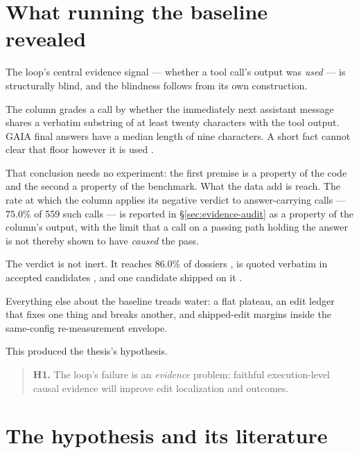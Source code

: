 \section{What running the baseline revealed}
\label{sec:baseline-revealed}

The loop's central evidence signal --- whether a tool call's output was
\emph{used} --- is structurally blind, and the blindness follows from its
own construction.

The column grades a call by whether the immediately next assistant message
shares a verbatim substring of at least twenty characters with the tool
output. GAIA final answers have a median length of nine characters. A short
fact cannot clear that floor however it is used .

That conclusion needs no experiment: the first premise is a property of
the code and the second a property of the benchmark. What the data add
is reach. The rate at which the column applies its negative verdict to
answer-carrying calls --- $75.0\%$ of 559 such calls  --- is
reported in \S\ref{sec:evidence-audit} as a property of the column's
output, with the limit that a call on a passing path holding the answer
is not thereby shown to have \emph{caused} the pass.

The verdict is not inert. It reaches $86.0\%$ of dossiers , is quoted
verbatim in accepted candidates , and one candidate shipped on it
.

Everything else about the baseline treads water: a flat plateau, an edit
ledger that fixes one thing and breaks another, and shipped-edit margins
inside the same-config re-measurement envelope.

\medskip
\noindent This produced the thesis's hypothesis.

\begin{quote}
\textbf{H1.} The loop's failure is an \emph{evidence} problem: faithful
execution-level causal evidence will improve edit localization and
outcomes.
\end{quote}

\section{The hypothesis and its literature}
\label{sec:hypothesis}


